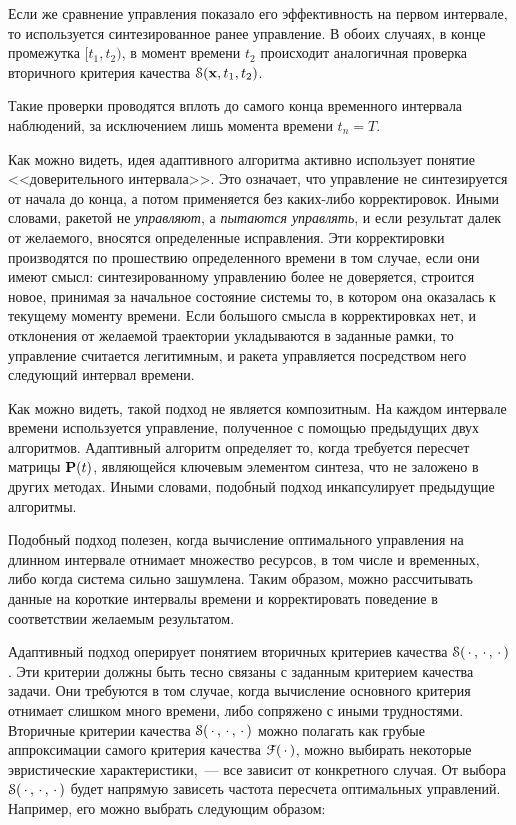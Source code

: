 Если же сравнение управления показало его эффективность на первом интервале, то используется синтезированное ранее управление. В обоих случаях, в конце промежутка $[t_1, t_2)$, в момент времени $t_2$ происходит аналогичная проверка вторичного критерия качества $\mathcal{S}(\mathbf{x}, t_1, t_2)$.

Такие проверки проводятся вплоть до самого конца временного интервала наблюдений, за исключением лишь момента времени $t_n = T$.

\br

Как можно видеть, идея адаптивного алгоритма активно использует понятие <<доверительного интервала>>. Это означает, что управление не синтезируется от начала до конца, а потом применяется без каких-либо корректировок. Иными словами, ракетой не \emph{управляют}, а \emph{пытаются управлять}, и если результат далек от желаемого, вносятся определенные исправления. Эти корректировки производятся по прошествию определенного времени в том случае, если они имеют смысл: синтезированному управлению более не доверяется, строится новое, принимая за начальное состояние системы то, в котором она оказалась к текущему моменту времени. Если большого смысла в корректировках нет, и отклонения от желаемой траектории укладываются в заданные рамки, то управление считается легитимным, и ракета управляется посредством него следующий интервал времени.

Как можно видеть, такой подход не является композитным. На каждом интервале времени используется управление, полученное с помощью предыдущих двух алгоритмов. Адаптивный алгоритм определяет то, когда требуется пересчет матрицы $\mathbf{P}(t)$, являющейся ключевым элементом синтеза, что не заложено в других методах. Иными словами, подобный подход инкапсулирует предыдущие алгоритмы.

Подобный подход полезен, когда вычисление оптимального управления на длинном интервале отнимает множество ресурсов, в том числе и временных, либо когда система сильно зашумлена. Таким образом, можно рассчитывать данные на короткие интервалы времени и корректировать поведение в соответствии желаемым результатом.

Адаптивный подход оперирует понятием вторичных критериев качества $\mathcal{S}(\,\cdotp, \,\cdotp, \,\cdotp)$. Эти критерии должны быть тесно связаны с заданным критерием качества задачи. Они требуются в том случае, когда вычисление основного критерия отнимает слишком много времени, либо сопряжено с иными трудностями. Вторичные критерии качества $\mathcal{S}(\,\cdotp, \,\cdotp, \,\cdotp)$ можно полагать как грубые аппроксимации самого критерия качества $\mathcal{F}(\,\cdotp)$, можно выбирать некоторые эвристические характеристики,~--- все зависит от конкретного случая. От выбора $\mathcal{S}(\,\cdotp, \,\cdotp, \,\cdotp)$ будет напрямую зависеть частота пересчета оптимальных управлений. Например, его можно выбрать следующим образом:

